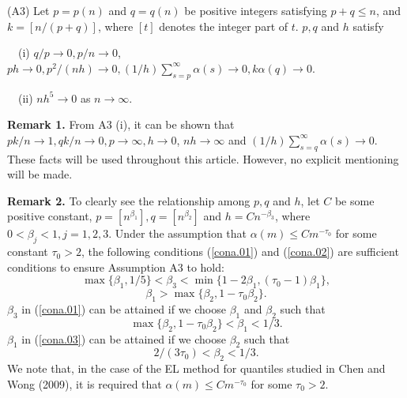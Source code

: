 \documentclass[12pt]{article}
\def\be{\begin{equation}}
\def\ee{\end{equation}}
\begin{document}

(A3)   Let $p=p(n)$ and $q=q(n)$ be positive integers satisfying $p+q\leq n$, and $ k=[n/(p+q)]$, where $[t]$ denotes the integer part of $t$. $p, q$ and $h$ satisfy

\ \ (i) $q/p\to 0, p/n\to 0$,  $ph\to 0, p^2/(nh)\to 0, (1/h)\sum^{\infty}_{s=p}\alpha(s)\to 0, k\alpha(q)\to 0$.

\ \ (ii)  $nh^5\to 0$ as $n\to \infty$.

\smallskip



{\bf Remark 1. }   From A3 (i), it can be shown that $pk/n\to 1, qk/n\to 0, p\to \infty, h\to 0$, $nh\to \infty$ and $(1/h)\sum^{\infty}_{s=q}\alpha(s)\to 0$.
These facts will be used throughout this article. However,
no explicit mentioning will be made.

\smallskip

{\bf Remark 2. } To clearly see the relationship among $p, q$ and $h$, let $C$ be some positive constant, $p=[n^{\beta_1}], q=[n^{\beta_2}]$ and $h=Cn^{-\beta_3}$, where $0<\beta_j<1, j=1, 2, 3$.  Under the assumption that $\alpha (m) \leq C m^{-\tau_0}$ for some constant $\tau_0>2$,
the following conditions (\ref{cona.01}) and (\ref{cona.02}) are sufficient conditions
to ensure Assumption A3 to hold:
\be
 \max  \{ \beta_1, 1/5  \}<\beta_3  <  \min \{  1-2\beta_1, (\tau_0-1)\beta_1 \}, \label{cona.01}
\ee
\be
\beta_1>\max\{ \beta_2, 1-\tau_0\beta_2\}.            \label{cona.02}
\ee
$\beta_3$ in (\ref{cona.01}) can be attained  if we choose $\beta_1$ and $\beta_2$ such that
\be
\max\{  \beta_2, 1-\tau_0\beta_2\}<\beta_1 < 1/3.           \label{cona.03}
\ee
$\beta_1$  in (\ref{cona.03}) can be attained if we choose $\beta_2$ such that
\[
2/(3\tau_0)<\beta_2<1/3.
\]
We note that, in the case of the EL method for quantiles studied in Chen and Wong (2009), it is required that  $\alpha (m) \leq C m^{-\tau_0}$ for some $\tau_0>2$.
\end{document}
